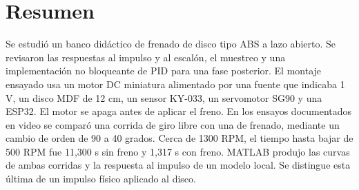\documentclass[9pt,a4paper,twocolumn]{extarticle}
\begin{document}
\section{Resumen}\label{resumen}

Se estudió un banco didáctico de frenado de disco tipo ABS a lazo abierto. Se revisaron las respuestas al impulso y al escalón, el muestreo y una implementación no bloqueante de PID para una fase posterior. El montaje ensayado usa un motor DC miniatura alimentado por una fuente que indicaba 1 V, un disco MDF de 12 cm, un sensor KY-033, un servomotor SG90 y una ESP32. El motor se apaga antes de aplicar el freno. En los ensayos documentados en video se comparó una corrida de giro libre con una de frenado, mediante un cambio de orden de 90 a 40 grados. Cerca de 1300 RPM, el tiempo hasta bajar de 500 RPM fue 11,300 s sin freno y 1,317 s con freno. MATLAB produjo las curvas de ambas corridas y la respuesta al impulso de un modelo local. Se distingue esta última de un impulso físico aplicado al disco.
\end{document}
